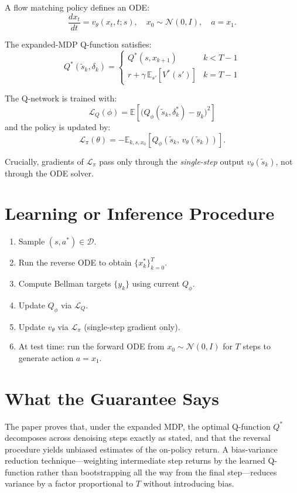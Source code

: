 \documentclass[10pt,twocolumn]{article}
\begin{document}
A flow matching policy defines an ODE:
\[
\frac{dx_t}{dt} = v_\theta(x_t, t; s), \quad x_0 \sim \mathcal{N}(0,I),
\quad a = x_1.
\]

The expanded-MDP Q-function satisfies:
\[
Q^*(\tilde s_k, \delta_k) =
\begin{cases}
  Q^*(s, x_{k+1}) & k < T-1\\[2pt]
  r + \gamma\,\mathbb{E}_{s'}[V^*(s')] & k = T-1
\end{cases}
\]

The Q-network is trained with:
\[
\mathcal{L}_Q(\phi) =
\mathbb{E}\!\left[\bigl(Q_\phi(\tilde s_k,\delta_k^*) - y_k\bigr)^2\right]
\]
and the policy is updated by:
\[
\mathcal{L}_\pi(\theta) =
-\mathbb{E}_{k,s,x_0}\!\left[Q_\phi\!\left(\tilde s_k,\,
v_\theta(\tilde s_k)\right)\right].
\]

Crucially, gradients of $\mathcal{L}_\pi$ pass only through the
\emph{single-step} output $v_\theta(\tilde s_k)$, not through the ODE solver.

\section{Learning or Inference Procedure}

\begin{enumerate}[itemsep=2pt,parsep=0pt]
  \item Sample $(s,a^*)\in\mathcal D$.
  \item Run the reverse ODE to obtain $\{x_k^*\}_{k=0}^T$.
  \item Compute Bellman targets $\{y_k\}$ using current $Q_\phi$.
  \item Update $Q_\phi$ via $\mathcal{L}_Q$.
  \item Update $v_\theta$ via $\mathcal{L}_\pi$ (single-step gradient only).
  \item At test time: run the forward ODE from $x_0\sim\mathcal{N}(0,I)$
    for $T$ steps to generate action $a=x_1$.
\end{enumerate}

\section{What the Guarantee Says}

The paper proves that, under the expanded MDP, the optimal Q-function $Q^*$
decomposes across denoising steps exactly as stated, and that the reversal
procedure yields unbiased estimates of the on-policy return. A bias-variance
reduction technique---weighting intermediate step returns by the learned
Q-function rather than bootstrapping all the way from the final step---reduces
variance by a factor proportional to $T$ without introducing bias.
\end{document}
